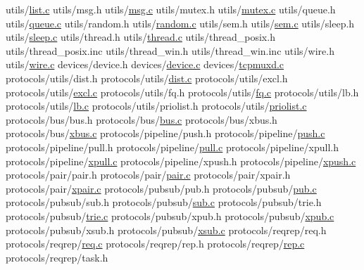 \begin{DoxyCompactItemize}
utils/\hyperlink{all__1_8js_a7d4a455e4f44360eeccfbf0c3079fc32}{list.\+c} utils/msg.\+h utils/\hyperlink{all__1_8js_a7d4a455e4f44360eeccfbf0c3079fc32}{msg.\+c} utils/mutex.\+h utils/\hyperlink{all__1_8js_a7d4a455e4f44360eeccfbf0c3079fc32}{mutex.\+c} utils/queue.\+h utils/\hyperlink{all__1_8js_a7d4a455e4f44360eeccfbf0c3079fc32}{queue.\+c} utils/random.\+h utils/\hyperlink{all__1_8js_a7d4a455e4f44360eeccfbf0c3079fc32}{random.\+c} utils/sem.\+h utils/\hyperlink{all__1_8js_a7d4a455e4f44360eeccfbf0c3079fc32}{sem.\+c} utils/sleep.\+h utils/\hyperlink{all__1_8js_a7d4a455e4f44360eeccfbf0c3079fc32}{sleep.\+c} utils/thread.\+h utils/\hyperlink{all__1_8js_a7d4a455e4f44360eeccfbf0c3079fc32}{thread.\+c} utils/thread\+\_\+posix.\+h utils/thread\+\_\+posix.\+inc utils/thread\+\_\+win.\+h utils/thread\+\_\+win.\+inc utils/wire.\+h utils/\hyperlink{all__1_8js_a7d4a455e4f44360eeccfbf0c3079fc32}{wire.\+c} devices/device.\+h devices/\hyperlink{all__1_8js_a7d4a455e4f44360eeccfbf0c3079fc32}{device.\+c} devices/\hyperlink{all__1_8js_a7d4a455e4f44360eeccfbf0c3079fc32}{tcpmuxd.\+c} protocols/utils/dist.\+h protocols/utils/\hyperlink{all__1_8js_a7d4a455e4f44360eeccfbf0c3079fc32}{dist.\+c} protocols/utils/excl.\+h protocols/utils/\hyperlink{all__1_8js_a7d4a455e4f44360eeccfbf0c3079fc32}{excl.\+c} protocols/utils/fq.\+h protocols/utils/\hyperlink{all__1_8js_a7d4a455e4f44360eeccfbf0c3079fc32}{fq.\+c} protocols/utils/lb.\+h protocols/utils/\hyperlink{all__1_8js_a7d4a455e4f44360eeccfbf0c3079fc32}{lb.\+c} protocols/utils/priolist.\+h protocols/utils/\hyperlink{all__1_8js_a7d4a455e4f44360eeccfbf0c3079fc32}{priolist.\+c} protocols/bus/bus.\+h protocols/bus/\hyperlink{all__1_8js_a7d4a455e4f44360eeccfbf0c3079fc32}{bus.\+c} protocols/bus/xbus.\+h protocols/bus/\hyperlink{all__1_8js_a7d4a455e4f44360eeccfbf0c3079fc32}{xbus.\+c} protocols/pipeline/push.\+h protocols/pipeline/\hyperlink{all__1_8js_a7d4a455e4f44360eeccfbf0c3079fc32}{push.\+c} protocols/pipeline/pull.\+h protocols/pipeline/\hyperlink{all__1_8js_a7d4a455e4f44360eeccfbf0c3079fc32}{pull.\+c} protocols/pipeline/xpull.\+h protocols/pipeline/\hyperlink{all__1_8js_a7d4a455e4f44360eeccfbf0c3079fc32}{xpull.\+c} protocols/pipeline/xpush.\+h protocols/pipeline/\hyperlink{all__1_8js_a7d4a455e4f44360eeccfbf0c3079fc32}{xpush.\+c} protocols/pair/pair.\+h protocols/pair/\hyperlink{all__1_8js_a7d4a455e4f44360eeccfbf0c3079fc32}{pair.\+c} protocols/pair/xpair.\+h protocols/pair/\hyperlink{all__1_8js_a7d4a455e4f44360eeccfbf0c3079fc32}{xpair.\+c} protocols/pubsub/pub.\+h protocols/pubsub/\hyperlink{all__1_8js_a7d4a455e4f44360eeccfbf0c3079fc32}{pub.\+c} protocols/pubsub/sub.\+h protocols/pubsub/\hyperlink{all__1_8js_a7d4a455e4f44360eeccfbf0c3079fc32}{sub.\+c} protocols/pubsub/trie.\+h protocols/pubsub/\hyperlink{all__1_8js_a7d4a455e4f44360eeccfbf0c3079fc32}{trie.\+c} protocols/pubsub/xpub.\+h protocols/pubsub/\hyperlink{all__1_8js_a7d4a455e4f44360eeccfbf0c3079fc32}{xpub.\+c} protocols/pubsub/xsub.\+h protocols/pubsub/\hyperlink{all__1_8js_a7d4a455e4f44360eeccfbf0c3079fc32}{xsub.\+c} protocols/reqrep/req.\+h protocols/reqrep/\hyperlink{all__1_8js_a7d4a455e4f44360eeccfbf0c3079fc32}{req.\+c} protocols/reqrep/rep.\+h protocols/reqrep/\hyperlink{all__1_8js_a7d4a455e4f44360eeccfbf0c3079fc32}{rep.\+c} protocols/reqrep/task.\+h 
\end{DoxyCompactItemize}
